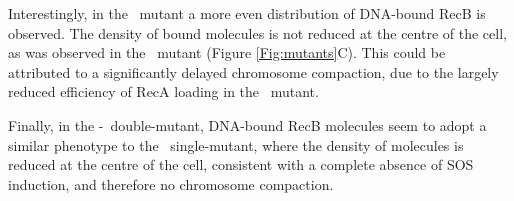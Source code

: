 Interestingly, in the \teneighty\ mutant a more even distribution of DNA-bound RecB is observed. The density of bound molecules is not reduced at the centre of the cell, as was observed in the \dreca\ mutant (Figure \ref{Fig:mutants}C). This could be attributed to a significantly delayed chromosome compaction, due to the largely reduced efficiency of RecA loading in the \teneighty\ mutant.

Finally, in the \dreca-\teneighty\ double-mutant, DNA-bound RecB molecules seem to adopt a similar phenotype to the \dreca\ single-mutant, where the density of molecules is reduced at the centre of the cell, consistent with a complete absence of SOS induction, and therefore no chromosome compaction.

